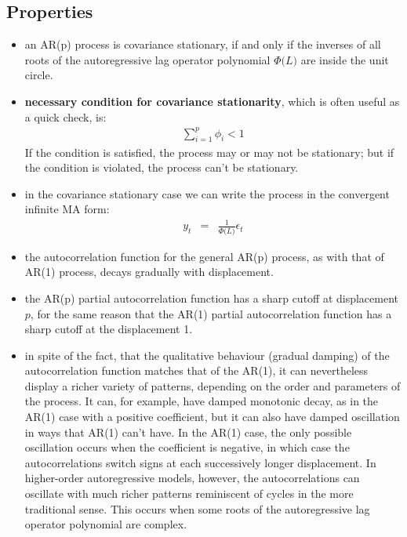 \subsection{Properties}
\begin{itemize}
	\item an AR(p) process is covariance stationary, if and only if the inverses of all roots of the autoregressive lag operator polynomial $\Phi\big(L\big)$ are inside the unit circle.
	\item \textbf{\color{blue}necessary condition for covariance stationarity}, which is often useful as a quick check, is:
	\begin{eqnarray}
		\sum_{i = 1}^{p}\phi_{i} < 1
	\end{eqnarray}
	If the condition is satisfied, the process may or may not be stationary; but if the condition is violated, the process can't be stationary.
	\item in the covariance stationary case we can write the process in the convergent infinite MA form:
	\begin{eqnarray}
		y_{t} &=& \frac{1}{\Phi\big(L\big)}\epsilon_{t}
	\end{eqnarray}
	\item the autocorrelation function for the general AR(p) process, as with that of AR(1) process, decays gradually with displacement.
	\item the AR(p) partial autocorrelation function has a sharp cutoff at displacement $p$, for the same reason that the AR(1) partial autocorrelation function has a sharp cutoff at the displacement 1.
	\item in spite of the fact, that the qualitative behaviour (gradual damping) of the autocorrelation function matches that of the AR(1), it can nevertheless display a richer variety of patterns, depending on the order and parameters of the process. It can, for example, have damped monotonic decay, as in the AR(1) case with a positive coefficient, but it can also have damped oscillation in ways that AR(1) can't have. In the AR(1) case, the only possible oscillation occurs when the coefficient is negative, in which case the autocorrelations switch signs at each successively longer displacement. In higher-order autoregressive models, however, the autocorrelations can oscillate with much richer patterns reminiscent of cycles in the more traditional sense. This occurs when some roots of the autoregressive lag operator polynomial are complex.
\end{itemize}

